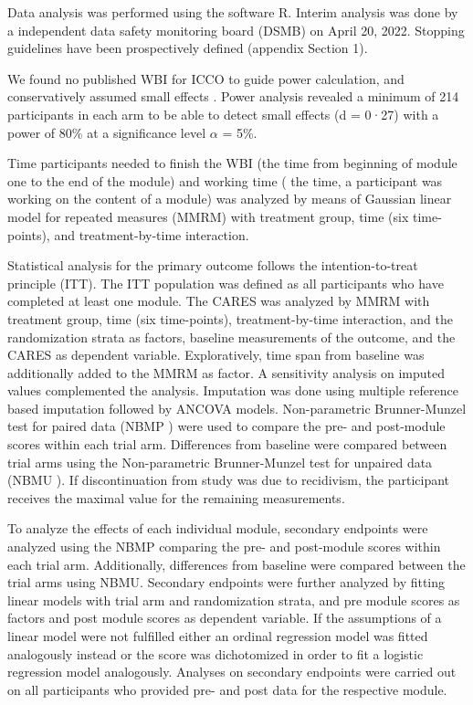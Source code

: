 \documentclass[
  super,
  preprint,
  1p,
  onecolumn]{elsarticle}
\begin{document}
Data analysis was performed using the software R.
\citep{rcoreteamLanguageEnvironmentStatistical2025} Interim analysis was
done by a independent data safety monitoring board (DSMB) on April 20,
2022. Stopping guidelines have been prospectively defined (appendix
Section 1).

We found no published WBI for ICCO to guide power calculation, and
conservatively assumed small effects . Power analysis revealed a minimum
of 214 participants in each arm to be able to detect small effects (d =
0·27) with a power of 80\% at a significance level \(\alpha\) = 5\%.

Time participants needed to finish the WBI (the time from beginning of
module one to the end of the module) and working time ( the time, a
participant was working on the content of a module) was analyzed by
means of Gaussian linear model for repeated measures (MMRM) with
treatment group, time (six time-points), and treatment-by-time
interaction.

Statistical analysis for the primary outcome follows the
intention-to-treat principle (ITT). The ITT population was defined as
all participants who have completed at least one module. The CARES was
analyzed by MMRM with treatment group, time (six time-points),
treatment-by-time interaction, and the randomization strata as factors,
baseline measurements of the outcome, and the CARES as dependent
variable. Exploratively, time span from baseline was additionally added
to the MMRM as factor. A sensitivity analysis on imputed values
complemented the analysis. Imputation was done using multiple reference
based imputation followed by ANCOVA models.
\citep{wolbersStandardReferencebasedConditional2022} Non-parametric
Brunner-Munzel test for paired data (NBMP
\citep{brunnerNonparametricBehrensFisherProblem2000}) were used to
compare the pre- and post-module scores within each trial arm.
Differences from baseline were compared between trial arms using the
Non-parametric Brunner-Munzel test for unpaired data (NBMU
\citep{brunnerNonparametricBehrensFisherProblem2000}). If
discontinuation from study was due to recidivism, the participant
receives the maximal value for the remaining measurements.

To analyze the effects of each individual module, secondary endpoints
were analyzed using the NBMP comparing the pre- and post-module scores
within each trial arm. Additionally, differences from baseline were
compared between the trial arms using NBMU. Secondary endpoints were
further analyzed by fitting linear models with trial arm and
randomization strata, and pre module scores as factors and post module
scores as dependent variable. If the assumptions of a linear model were
not fulfilled either an ordinal regression model was fitted analogously
instead or the score was dichotomized in order to fit a logistic
regression model analogously. Analyses on secondary endpoints were
carried out on all participants who provided pre- and post data for the
respective module.
\end{document}

